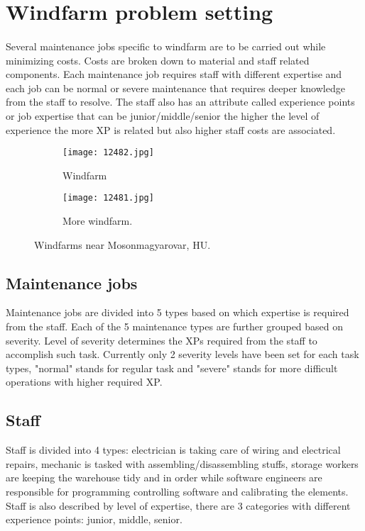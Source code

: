 \section{Windfarm problem setting}
  \paragraph{}
    Several maintenance jobs specific to windfarm are to be carried out while minimizing costs. 
    Costs are broken down to material and staff related components. Each maintenance job 
    requires staff with different expertise and each job can be normal or severe maintenance 
    that requires deeper knowledge from the staff to resolve. The staff also has an attribute 
    called experience points or job expertise that can be junior/middle/senior the higher 
    the level of experience the more XP is related but also higher staff costs are associated.

    \begin{figure}[h!]
      \centering
      \begin{subfigure}[b]{0.4\textwidth}
        \centering
        \texttt{[image: 12482.jpg]}
        \caption{Windfarm}
        \label{fig:Windfarm}
      \end{subfigure}
      \hfill
      \begin{subfigure}[b]{0.4\textwidth}
        \texttt{[image: 12481.jpg]}
        \caption{More windfarm.}
        \label{fig:More windfarm}
      \end{subfigure}
      \caption{Windfarms near Mosonmagyarovar, HU.}
    \end{figure}

    \subsection{Maintenance jobs}
      Maintenance jobs are divided into 5 types based on which expertise is required from the staff. 
      Each of the 5 maintenance types are further grouped based on severity. Level of severity 
      determines the XPs required from the staff to accomplish such task. Currently only 
      2 severity levels have been set for each task types, "normal" stands for regular task 
      and "severe" stands for more difficult operations with higher required XP.

    \subsection{Staff}
      Staff is divided into 4 types: electrician is taking care of wiring and electrical repairs, 
      mechanic is tasked with assembling/disassembling stuffs, storage workers are keeping 
      the warehouse tidy and in order while software engineers are responsible for 
      programming controlling software and calibrating the elements. Staff is also described by 
      level of expertise, there are 3 categories with different experience points: junior, middle, senior.

